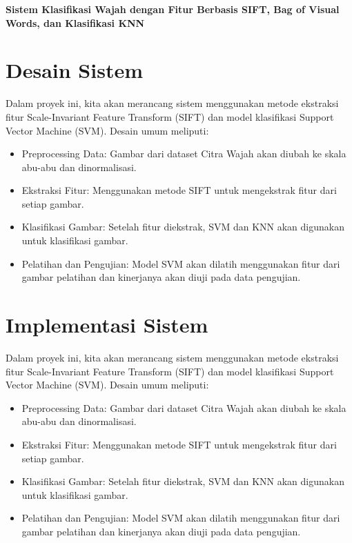 \documentclass[
  letterpaper,
  DIV=11,
  numbers=noendperiod]{scrreprt}
\providecommand{\tightlist}{%
  \setlength{\itemsep}{0pt}\setlength{\parskip}{0pt}}\usepackage{longtable,booktabs,array}
\begin{document}

\textbf{Sistem Klasifikasi Wajah dengan Fitur Berbasis SIFT, Bag of
Visual Words, dan Klasifikasi KNN}

\hypertarget{desain-sistem}{%
\section*{Desain Sistem}\label{desain-sistem}}


Dalam proyek ini, kita akan merancang sistem menggunakan metode
ekstraksi fitur Scale-Invariant Feature Transform (SIFT) dan model
klasifikasi Support Vector Machine (SVM). Desain umum meliputi:

\begin{itemize}
\tightlist
\item
  Preprocessing Data: Gambar dari dataset Citra Wajah akan diubah ke
  skala abu-abu dan dinormalisasi.
\item
  Ekstraksi Fitur: Menggunakan metode SIFT untuk mengekstrak fitur dari
  setiap gambar.
\item
  Klasifikasi Gambar: Setelah fitur diekstrak, SVM dan KNN akan
  digunakan untuk klasifikasi gambar.
\item
  Pelatihan dan Pengujian: Model SVM akan dilatih menggunakan fitur dari
  gambar pelatihan dan kinerjanya akan diuji pada data pengujian.
\end{itemize}

\hypertarget{implementasi-sistem}{%
\section*{Implementasi Sistem}\label{implementasi-sistem}}


Dalam proyek ini, kita akan merancang sistem menggunakan metode
ekstraksi fitur Scale-Invariant Feature Transform (SIFT) dan model
klasifikasi Support Vector Machine (SVM). Desain umum meliputi:

\begin{itemize}
\tightlist
\item
  Preprocessing Data: Gambar dari dataset Citra Wajah akan diubah ke
  skala abu-abu dan dinormalisasi.
\item
  Ekstraksi Fitur: Menggunakan metode SIFT untuk mengekstrak fitur dari
  setiap gambar.
\item
  Klasifikasi Gambar: Setelah fitur diekstrak, SVM dan KNN akan
  digunakan untuk klasifikasi gambar.
\item
  Pelatihan dan Pengujian: Model SVM akan dilatih menggunakan fitur dari
  gambar pelatihan dan kinerjanya akan diuji pada data pengujian.
\end{itemize}
\end{document}
